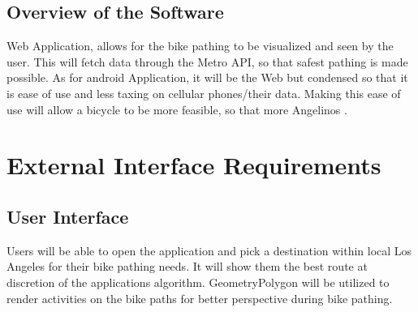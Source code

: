 \documentclass[a4paper,12pt]{article}
\begin{document}
\subsection{Overview of the Software}
Web Application, allows for the bike pathing to be visualized and seen by the user. This will fetch data through the Metro API, so that safest pathing is made possible. As for android Application, it will be the Web but condensed so that it is ease of use and less taxing on cellular phones/their data. Making this ease of use will allow a bicycle to be more feasible, so that more Angelinos . 

\section{External Interface Requirements}
\subsection{User Interface}
Users will be able to open the application and pick a destination within local Los Angeles for their bike pathing needs. It will show them the best route at discretion of the applications algorithm. GeometryPolygon will be utilized to render activities on the bike paths for better perspective during bike pathing. 
\end{document}
